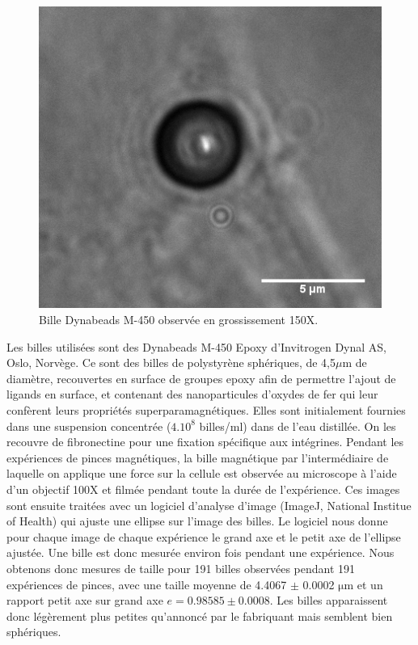 \documentclass{report}
\newcommand{\micro}{$\mathrm{\mu}$}
\begin{document}
		\begin{figure}
		\includegraphics[scale=0.4]{Bille.PNG}
		\caption{Bille Dynabeads M-450 observée en grossissement 150X. }
		\end{figure}
		Les billes utilisées sont des Dynabeads M-450 Epoxy d'Invitrogen Dynal AS, Oslo, Norvège. 
		Ce sont des billes de polystyrène sphériques, de 4,5$\mu$m de diamètre, recouvertes en surface de groupes epoxy afin de permettre l'ajout de ligands en surface, et contenant des nanoparticules d'oxydes de fer qui leur confèrent leurs propriétés superparamagnétiques. 
		Elles sont initialement fournies dans une suspension concentrée ($4.10^8$ billes/ml) dans de l'eau distillée. On les recouvre de fibronectine pour une fixation spécifique aux intégrines.
		Pendant les expériences de pinces magnétiques, la bille magnétique par l'intermédiaire de laquelle on applique une force sur la cellule est observée au microscope à l'aide d'un objectif 100X et filmée pendant toute la durée de l'expérience.  Ces images sont ensuite traitées avec un logiciel d'analyse d'image (ImageJ, National Institue of Health) qui ajuste une ellipse sur l'image des billes. Le logiciel nous donne pour chaque image de chaque expérience le grand axe et le petit axe de l'ellipse ajustée. Une bille est donc mesurée environ  fois pendant une expérience.  
		Nous obtenons donc  mesures de taille pour 191 billes observées pendant 191 expériences de pinces, avec une taille moyenne de 4.4067 $\pm$ 0.0002 \micro m et un rapport petit axe sur grand axe $e=0.98585 \pm 0.0008$. Les billes apparaissent donc légèrement plus petites qu'annoncé par le fabriquant mais semblent bien sphériques.
\end{document}
